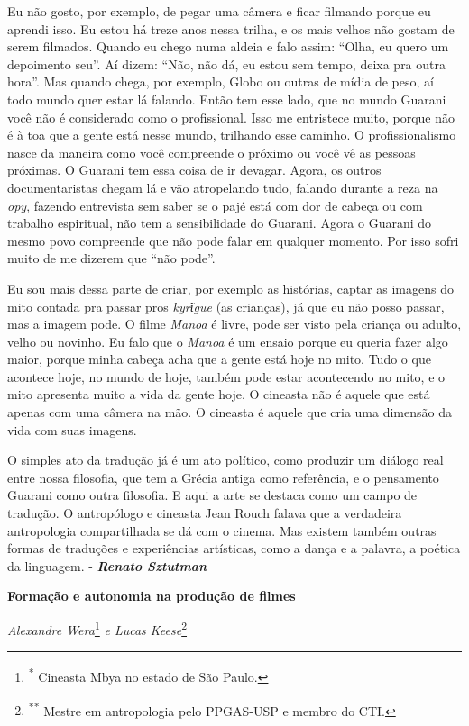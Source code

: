 Eu não gosto, por exemplo, de pegar uma câmera e ficar filmando porque
eu aprendi isso. Eu estou há treze anos nessa trilha, e os mais velhos
não gostam de serem filmados. Quando eu chego numa aldeia e falo assim:
``Olha, eu quero um depoimento seu''. Aí dizem: ``Não, não dá, eu estou
sem tempo, deixa pra outra hora''. Mas quando chega, por exemplo, Globo
ou outras de mídia de peso, aí todo mundo quer estar lá falando. Então
tem esse lado, que no mundo Guarani você não é considerado como o
profissional. Isso me entristece muito, porque não é à toa que a gente
está nesse mundo, trilhando esse caminho. O profissionalismo nasce da
maneira como você compreende o próximo ou você vê as pessoas próximas. O
Guarani tem essa coisa de ir devagar. Agora, os outros documentaristas
chegam lá e vão atropelando tudo, falando durante a reza na \emph{opy},
fazendo entrevista sem saber se o pajé está com dor de cabeça ou com
trabalho espiritual, não tem a sensibilidade do Guarani. Agora o Guarani
do mesmo povo compreende que não pode falar em qualquer momento. Por
isso sofri muito de me dizerem que ``não pode''.

Eu sou mais dessa parte de criar, por exemplo as histórias, captar as
imagens do mito contada pra passar pros \emph{kyrῖgue} (as crianças), já
que eu não posso passar, mas a imagem pode. O filme \emph{Manoa} é
livre, pode ser visto pela criança ou adulto, velho ou novinho. Eu falo
que o \emph{Manoa} é um ensaio porque eu queria fazer algo maior, porque
minha cabeça acha que a gente está hoje no mito. Tudo o que acontece
hoje, no mundo de hoje, também pode estar acontecendo no mito, e o mito
apresenta muito a vida da gente hoje. O cineasta não é aquele que está
apenas com uma câmera na mão. O cineasta é aquele que cria uma dimensão
da vida com suas imagens.

O simples ato da tradução já é um ato político, como produzir um diálogo
real entre nossa filosofia, que tem a Grécia antiga como referência, e o
pensamento Guarani como outra filosofia. E aqui a arte se destaca como
um campo de tradução. O antropólogo e cineasta Jean Rouch falava que a
verdadeira antropologia compartilhada se dá com o cinema. Mas existem
também outras formas de traduções e experiências artísticas, como a
dança e a palavra, a poética da linguagem. - \emph{\textbf{Renato
Sztutman}}

\textbf{Formação e autonomia na produção de filmes}

\emph{Alexandre Wera}\footnote{\textsuperscript{*} Cineasta Mbya no
  estado de São Paulo.} \emph{e Lucas Keese}\footnote{\textsuperscript{**}
  Mestre em antropologia pelo PPGAS-USP e membro do CTI.}

